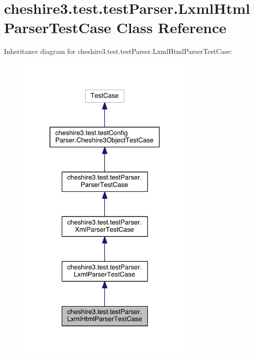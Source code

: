 \hypertarget{classcheshire3_1_1test_1_1test_parser_1_1_lxml_html_parser_test_case}{\section{cheshire3.\-test.\-test\-Parser.\-Lxml\-Html\-Parser\-Test\-Case Class Reference}
\label{classcheshire3_1_1test_1_1test_parser_1_1_lxml_html_parser_test_case}
}


Inheritance diagram for cheshire3.\-test.\-test\-Parser.\-Lxml\-Html\-Parser\-Test\-Case\-:
\nopagebreak
\begin{figure}[H]
\begin{center}
\leavevmode
\includegraphics[width=246pt]{classcheshire3_1_1test_1_1test_parser_1_1_lxml_html_parser_test_case__inherit__graph}
\end{center}
\end{figure}


